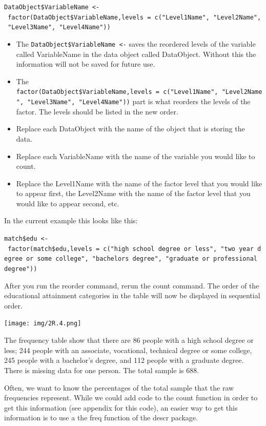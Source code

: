 \documentclass[
]{book}
\providecommand{\tightlist}{%
  \setlength{\itemsep}{0pt}\setlength{\parskip}{0pt}}
\begin{document}
\texttt{DataObject\$VariableName\ \textless{}-\ factor(DataObject\$VariableName,levels\ =\ c("Level1Name",\ "Level2Name",\ "Level3Name",\ "Level4Name"))}

\begin{itemize}
\tightlist
\item
  The \texttt{DataObject\$VariableName\ \textless{}-} saves the reordered levels of the variable called VariableName in the data object called DataObject. Without this the information will not be saved for future use.\\
\item
  The \texttt{factor(DataObject\$VariableName,levels\ =\ c("Level1Name",\ "Level2Name",\ "Level3Name",\ "Level4Name"))} part is what reorders the levels of the factor. The levels should be listed in the new order.\\
\item
  Replace each DataObject with the name of the object that is storing the data.\\
\item
  Replace each VariableName with the name of the variable you would like to count.\\
\item
  Replace the Level1Name with the name of the factor level that you would like to appear first, the Level2Name with the name of the factor level that you would like to appear second, etc.
\end{itemize}

In the current example this looks like this:

\texttt{match\$edu\ \textless{}-\ factor(match\$edu,levels\ =\ c("high\ school\ degree\ or\ less",\ "two\ year\ degree\ or\ some\ college",\ "bachelors\ degree",\ "graduate\ or\ professional\ degree"))}

After you run the reorder command, rerun the count command. The order of the educational attainment categories in the table will now be displayed in sequential order.

\texttt{[image: img/2R.4.png]}

The frequency table show that there are 86 people with a high school degree or less; 244 people with an associate, vocational, technical degree or some college, 245 people with a bachelor's degree, and 112 people with a graduate degree. There is missing data for one person. The total sample is 688.

Often, we want to know the percentages of the total sample that the raw frequencies represent. While we could add code to the count function in order to get this information (see appendix for this code), an easier way to get this information is to use a the freq function of the descr package.
\end{document}
